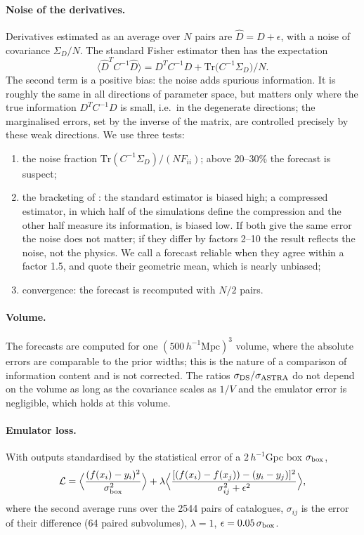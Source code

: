 \documentclass[11pt,twocolumn]{article}
\newcommand{\Mpch}{\,h^{-1}\mathrm{Mpc}}
\begin{document}
\paragraph{Noise of the derivatives.} Derivatives estimated as an average over $N$ pairs are $\hat D = D + \epsilon$, with a noise of covariance $\Sigma_D/N$. The standard Fisher estimator then has the expectation
\begin{equation}
\langle \hat D^T C^{-1}\hat D\rangle = D^T C^{-1} D + \mathrm{Tr}\big(C^{-1}\Sigma_D\big)/N .
\end{equation}
The second term is a positive bias: the noise adds spurious information. It is roughly the same in all directions of parameter space, but matters only where the true information $D^TC^{-1}D$ is small, i.e.\ in the degenerate directions; the marginalised errors, set by the inverse of the matrix, are controlled precisely by these weak directions. We use three tests:
\begin{enumerate}
\item the noise fraction $\mathrm{Tr}(C^{-1}\Sigma_D)/(N F_{ii})$; above 20--30\% the forecast is suspect;
\item the bracketing of \cite{CoultonWandelt2023}: the standard estimator is biased high; a compressed estimator, in which half of the simulations define the compression and the other half measure its information, is biased low. If both give the same error the noise does not matter; if they differ by factors 2--10 the result reflects the noise, not the physics. We call a forecast reliable when they agree within a factor 1.5, and quote their geometric mean, which is nearly unbiased;
\item convergence: the forecast is recomputed with $N/2$ pairs.
\end{enumerate}

\paragraph{Volume.} The forecasts are computed for one $(500\Mpch)^3$ volume, where the absolute errors are comparable to the prior widths; this is the nature of a comparison of information content and is not corrected. The ratios $\sigma_{\rm DS}/\sigma_{\rm ASTRA}$ do not depend on the volume as long as the covariance scales as $1/V$ and the emulator error is negligible, which holds at this volume.

\paragraph{Emulator loss.} With outputs standardised by the statistical error of a $2\,h^{-1}$Gpc box $\sigma_{\rm box}$,
\begin{equation}
\mathcal L = \Big\langle \frac{(f(x_i) - y_i)^2}{\sigma_{\rm box}^2}\Big\rangle + \lambda \Big\langle \frac{[(f(x_i) - f(x_j)) - (y_i - y_j)]^2}{\sigma_{ij}^2 + \epsilon^2}\Big\rangle,
\end{equation}
where the second average runs over the 2544 pairs of catalogues, $\sigma_{ij}$ is the error of their difference (64 paired subvolumes), $\lambda=1$, $\epsilon=0.05\,\sigma_{\rm box}$.
\end{document}
